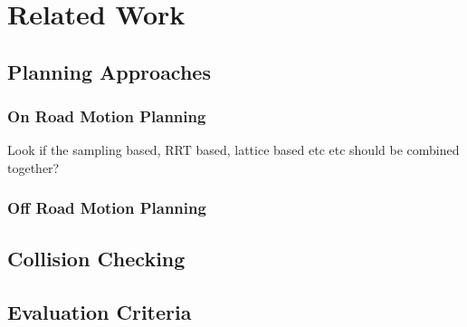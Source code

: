 \chapter{Related Work}
\label{related_work}
\section{Planning Approaches}
\subsection{On Road Motion Planning}
Look if the sampling based, RRT based, lattice based etc etc should be combined together?
\subsection{Off Road Motion Planning}
\section{Collision Checking}
\section{Evaluation Criteria}
